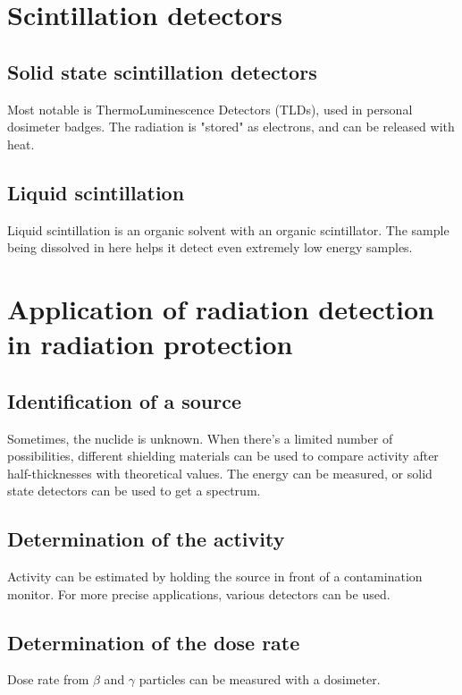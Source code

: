 \section{Scintillation detectors}
\subsection{Solid state scintillation detectors}
Most notable is ThermoLuminescence Detectors (TLDs), used in personal dosimeter badges. The radiation is "stored" as electrons, and can be released with heat.
\subsection{Liquid scintillation}
Liquid scintillation is an organic solvent with an organic scintillator. The sample being dissolved in here helps it detect even extremely low energy samples.
\section{Application of radiation detection in radiation protection}
\subsection{Identification of a source}
Sometimes, the nuclide is unknown. When there's a limited number of possibilities, different shielding materials can be used to compare activity after half-thicknesses with theoretical values. The energy can be measured, or solid state detectors can be used to get a spectrum.
\subsection{Determination of the activity}
Activity can be estimated by holding the source in front of a contamination monitor. For more precise applications, various detectors can be used.
\subsection{Determination of the dose rate}
Dose rate from $\beta$ and $\gamma$ particles can be measured with a dosimeter. 
